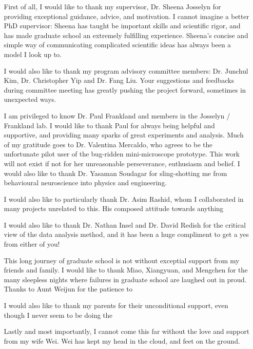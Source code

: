 First of all, I would like to thank my supervisor, Dr. Sheena Josselyn for providing exceptional guidance, advice, and motivation. I cannot imagine a better PhD supervisor: Sheena has taught be important skills and scientific rigor, and has made graduate school an extremely fulfilling experience. Sheena's concise and simple way of communicating complicated scientific ideas has always been a model I look up to. 

I would also like to thank my program advisory committee members: Dr. Junchul Kim, Dr. Christopher Yip and Dr. Fang Liu. Your suggestions and feedbacks during committee meeting has greatly pushing the project forward, sometimes in unexpected ways. 

I am privileged to know Dr. Paul Frankland and members in the Josselyn / Frankland lab. I would like to thank Paul for always being helpful and supportive, and providing many sparks of great experiments and analysis. Much of my gratitude goes to Dr. Valentina Mercaldo, who agrees to be the unfortunate pilot user of the bug-ridden mini-microscope prototype. This work will not exist if not for her unreasonable perseverance, euthusiasm and belief. I would also like to thank Dr. Yasaman Soudagar for sling-shotting me from behavioural neuroscience into physics and engineering. 

I would also like to particularly thank Dr. Asim Rashid, whom I collaborated in many projects unrelated to this. His composed attitude towards anything 

I would also like to thank Dr. Nathan Insel and Dr. David Redish for the critical view of the data analysis method, and it has been a huge compliment to get a yes from either of you! 

This long journey of graduate school is not without exceptial support from my friends and family.  I would like to thank Miao, Xiangyuan, and Mengchen for the many sleepless nights where failures in graduate school are laughed out in proud. Thanks to Aunt Weijun for the patience to   



I would also like to thank my parents for their unconditional support, even though I never seem to be doing the 


Lastly and most importantly, I cannot come this far without the love and support from my wife Wei. Wei has kept my head in the cloud, and feet on the ground. 



